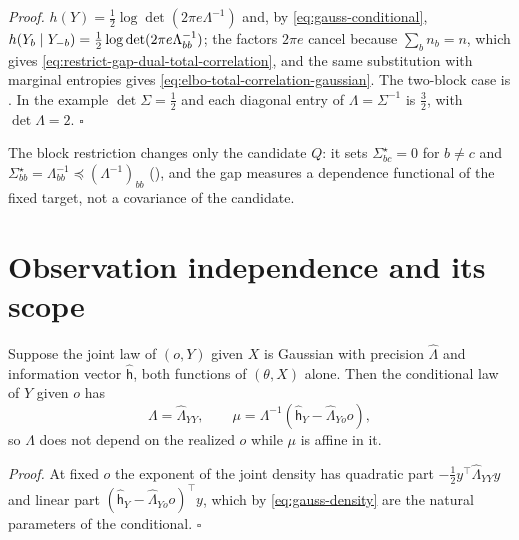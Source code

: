 \noindent\emph{Proof.}
\(h(Y)=\tfrac12\log\det(2\pi e\Lambda^{-1})\) and, by \eqref{eq:gauss-conditional},
\(h(Y_b\mid Y_{-b})=\tfrac12\log\det(2\pi e\Lambda_{bb}^{-1})\); the factors
\(2\pi e\) cancel because \(\sum_bn_b=n\), which gives
\eqref{eq:restrict-gap-dual-total-correlation}, and the same substitution with
marginal entropies gives \eqref{eq:elbo-total-correlation-gaussian}. The
two-block case is . In the example
\(\det\Sigma=\tfrac12\) and each diagonal entry of \(\Lambda=\Sigma^{-1}\) is
\(\tfrac32\), with \(\det\Lambda=2\). \(\square\)

The block restriction changes only the candidate \(Q\): it sets
\(\Sigma^\star_{bc}=0\) for \(b\neq c\) and
\(\Sigma^\star_{bb}=\Lambda_{bb}^{-1}\preceq(\Lambda^{-1})_{bb}\)
(), and the gap measures a dependence
functional of the fixed target, not a covariance of the candidate.

\section{Observation independence and its scope}
\label{sec:restrict-observation}

Suppose the joint law of \((o,Y)\) given \(X\) is Gaussian with precision
\(\widehat\Lambda\) and information vector \(\widehat{\mathsf h}\), both
functions of \((\theta,X)\) alone. Then the conditional law of \(Y\) given
\(o\) has
\begin{equation}
\Lambda=\widehat\Lambda_{YY},
\qquad
\mu=\Lambda^{-1}\left(\widehat{\mathsf h}_Y-\widehat\Lambda_{Yo}o\right),
\label{eq:restrict-conditional-from-joint}
\end{equation}
so \(\Lambda\) does not depend on the realized \(o\) while \(\mu\) is affine in
it. 

\noindent\emph{Proof.}
At fixed \(o\) the exponent of the joint density has quadratic part
\(-\tfrac12y^\top\widehat\Lambda_{YY}y\) and linear part
\((\widehat{\mathsf h}_Y-\widehat\Lambda_{Yo}o)^\top y\), which by
\eqref{eq:gauss-density} are the natural parameters of the conditional.
\(\square\)

